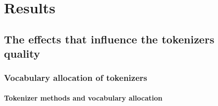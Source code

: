 \chapter{Results}




\section{The effects that influence the tokenizers quality}


\subsection{Vocabulary allocation of tokenizers}
\subsubsection{Tokenizer methods and vocabulary allocation}



